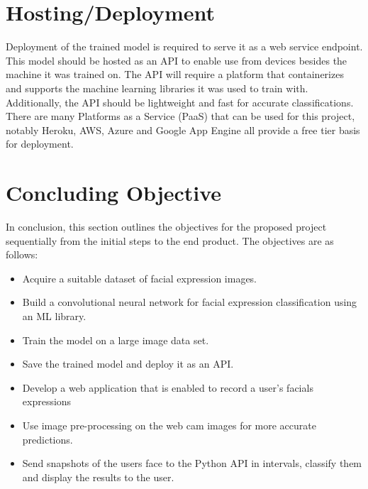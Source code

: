\section{Hosting/Deployment}
Deployment of the trained model is required to serve it as a web service endpoint. This model should be hosted as an API to enable use from devices besides the machine it was trained on. The API will require a platform that containerizes and supports the machine learning libraries it was used to train with. Additionally, the API should be lightweight and fast for accurate classifications. There are many Platforms as a Service (PaaS) that can be used for this project, notably Heroku, AWS, Azure and Google App Engine all provide a free tier basis for deployment.


\section{Concluding Objective}
In conclusion, this section outlines the objectives for the proposed project sequentially from the initial steps to the end product. The objectives are as follows:

\begin{itemize}
	\item Acquire a suitable dataset of facial expression images.
	\item Build a convolutional neural network for facial expression classification using an ML library.
	\item Train the model on a large image data set.
	\item Save the trained model and deploy it as an API.
	\item Develop a web application that is enabled to record a user's facials expressions
	\item Use image pre-processing on the web cam images for more accurate predictions.
	\item Send snapshots of the users face to the Python API in intervals, classify them and display the results to the user.
\end{itemize}

